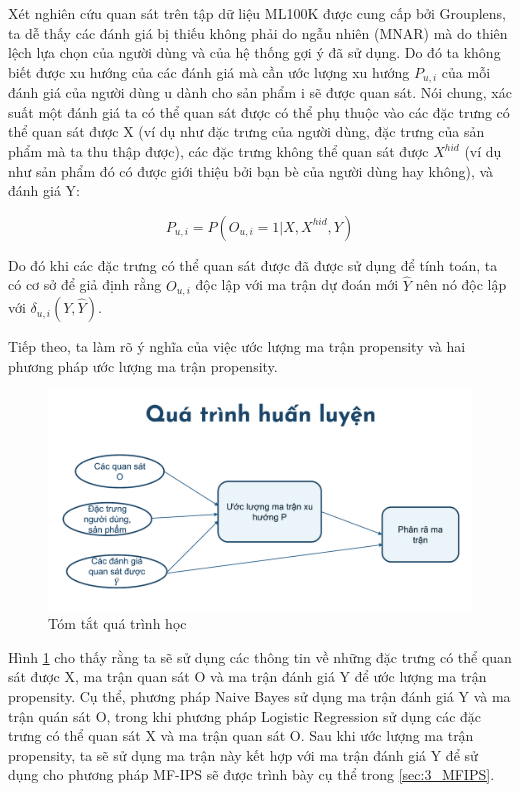 Xét nghiên cứu quan sát trên tập dữ liệu ML100K được cung cấp bởi Grouplens, ta dễ thấy các đánh giá bị thiếu không phải do ngẫu nhiên (MNAR) mà do thiên lệch lựa chọn của người dùng và của hệ thống gợi ý đã sử dụng. Do đó ta không biết được xu hướng của các đánh giá mà  cần ước lượng xu hướng $P_{u,i}$ của mỗi đánh giá của người dùng u dành cho sản phẩm i sẽ được quan sát. Nói chung, xác suất một đánh giá ta có thể quan sát được có thể phụ thuộc vào các đặc trưng có thể quan sát được X (ví dụ như đặc trưng của người dùng, đặc trưng của sản phẩm mà ta thu thập được), các đặc trưng không thể quan sát được $X^{hid}$ (ví dụ như sản phẩm đó có được giới thiệu bởi bạn bè của người dùng hay không), và đánh giá Y:

\begin{equation}
\label{eq:pui}
    P_{u,i}=P(O_{u,i} = 1|X, X^{hid},Y)
\end{equation}

Do đó khi các đặc trưng có thể quan sát được đã được sử dụng để tính toán, ta có cơ sở để giả định rằng $O_{u,i}$ độc lập với ma trận dự đoán mới $\hat{Y}$ nên nó độc lập với $\delta_{u,i}(Y,\hat{Y})$.

Tiếp theo, ta làm rõ ý nghĩa của việc ước lượng ma trận propensity và hai phương pháp ước lượng ma trận propensity.

\begin{figure}[h]
    \centering
    \includegraphics[width=\textwidth]{images/Chapter3/progress.png}
    \caption{Tóm tắt quá trình học}
    \label{fig:3.3_progress}
\end{figure}

Hình \ref{fig:3.3_progress} cho thấy rằng ta sẽ sử dụng các thông tin về những đặc trưng có thể quan sát được X, ma trận quan sát O và ma trận đánh giá Y để ước lượng ma trận propensity. Cụ thể, phương pháp Naive Bayes sử dụng ma trận đánh giá Y và ma trận quán sát O, trong khi phương pháp Logistic Regression sử dụng các đặc trưng có thể quan sát X và ma trận quan sát O. Sau khi ước lượng ma trận propensity, ta sẽ sử dụng ma trận này kết hợp với ma trận đánh giá Y để sử dụng cho phương pháp MF-IPS sẽ được trình bày cụ thể trong \ref{sec:3_MFIPS}. 


